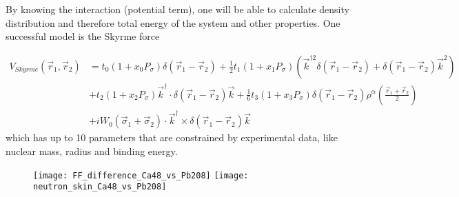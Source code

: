 By knowing the interaction (potential term), one will be able to calculate density
distribution and therefore total energy of the system and other properties. One
successful model is the Skyrme force

\begin{equation}
    \begin{aligned}
	V_{Skyrme}(\vec{r}_1, \vec{r}_2) &= t_0 (1 + x_0 P_\sigma)\delta(\vec{r}_1 - \vec{r}_2) 
	+ \frac{1}{2}t_1 (1 + x_1 P_\sigma) \left( \vec{k}^{\dag2}\delta(\vec{r}_1 - \vec{r}_2) + \delta(\vec{r}_1 - \vec{r}_2)\vec{k}^2 \right)    \\
	&+ t_2(1 + x_2 P_\sigma)\vec{k}^\dag \cdot \delta(\vec{r}_1 
	    - \vec{r}_2)\vec{k} + \frac{1}{6} t_3 (1 + x_3 P_\sigma)\delta(\vec{r}_1 - \vec{r}_2) \rho^\alpha\left( \frac{\vec{r}_1 + \vec{r}_2}{2} \right) \\
	&+ iW_0 (\vec{\sigma}_1 + \vec{\sigma}_2) \cdot \vec{k}^\dag \times \delta(\vec{r}_1 - \vec{r}_2) \vec{k}
    \end{aligned}
\end{equation}
which has up to 10 parameters that are constrained by experimental data, like
nuclear mass, radius and binding energy.

\begin{comment}
DFT is actually also an ab-initio method, the key distinction lies in the
exchange-correclation functional, some DFT models have its parameters fitted
to empirical data, but most reliable result are based on first-principles.

The basic idea is simple, once we know the density distribution function, then
one can calculate the total energy of the system based on this distribution 
function, minimization of the total energy will be the ground state, and other
static properties will be inferred from the ground state. Excitation properties
can also be calculated from DFT. The only problem is how to know the density
distributio function.
\end{comment}

\begin{figure}
    \centering
    \texttt{[image: FF\_difference\_Ca48\_vs\_Pb208]}
    \texttt{[image: neutron\_skin\_Ca48\_vs\_Pb208]}
\end{figure}



